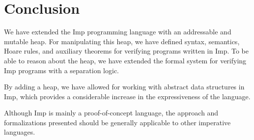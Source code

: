 \section{Conclusion}
\label{sec:conclusion}
We have extended the Imp programming language with an addressable and mutable heap. For manipulating this heap, we have defined syntax, semantics, Hoare rules, and auxiliary theorems for verifying programs written in Imp. To be able to reason about the heap, we have extended the formal system for verifying Imp programs with a separation logic.

By adding a heap, we have allowed for working with abstract data structures in Imp, which provides a considerable increase in the expressiveness of the language.

Although Imp is mainly a proof-of-concept language, the approach and formalizations presented should be generally applicable to other imperative languages. 